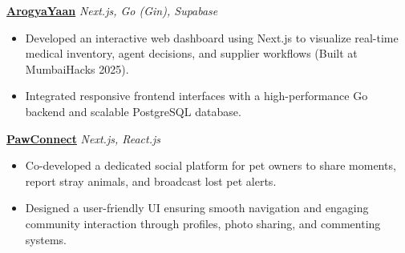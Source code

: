 \documentclass[a4paper,10pt]{article}
\begin{document}
\vspace{1ex}

\noindent \href{https://github.com/awk-way/arogyaan-dash}{\large\textbf{ArogyaYaan}} \hfill \textit{Next.js, Go (Gin), Supabase}
\begin{itemize}
    \item Developed an interactive web dashboard using Next.js to visualize real-time medical inventory, agent decisions, and supplier workflows (Built at MumbaiHacks 2025).
    \item Integrated responsive frontend interfaces with a high-performance Go backend and scalable PostgreSQL database.
\end{itemize}

\vspace{1ex}

\noindent \href{https://github.com/vedeeka/launch_frontend}{\large\textbf{PawConnect}} \hfill \textit{Next.js, React.js}
\begin{itemize}
    \item Co-developed a dedicated social platform for pet owners to share moments, report stray animals, and broadcast lost pet alerts.
    \item Designed a user-friendly UI ensuring smooth navigation and engaging community interaction through profiles, photo sharing, and commenting systems.
\end{itemize}
\end{document}
